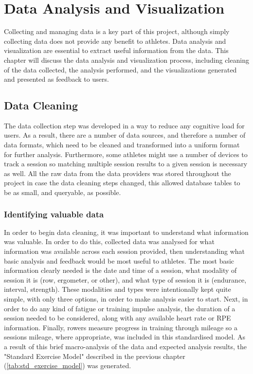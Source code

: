 \chapter{Data Analysis and Visualization} \label{chap:data-analysis-viz}
Collecting and managing data is a key part of this project, although simply collecting data does not provide any benefit to athletes. Data analysis and visualization are essential to extract useful information from the data. This chapter will discuss the data analysis and visualization process, including cleaning of the data collected, the analysis performed, and the visualizations generated and presented as feedback to users.

\section{Data Cleaning}\label{sec:data-cleaning}
The data collection step was developed in a way to reduce any cognitive load for users. As a result, there are a number of data sources, and therefore a number of data formats, which need to be cleaned and transformed into a uniform format for further analysis. Furthermore, some athletes might use a number of devices to track a session so matching multiple session results to a given session is necessary as well. All the raw data from the data providers was stored throughout the project in case the data cleaning steps changed, this allowed database tables to be as small, and queryable, as possible.
\subsection{Identifying valuable data}
In order to begin data cleaning, it was important to understand what information was valuable. In order to do this, collected data was analysed for what information was available across each session provided, then understanding what basic analysis and feedback would be most useful to athletes. The most basic information clearly needed is the date and time of a session, what modality of session it is (row, ergometer, or other), and what type of session it is (endurance, interval, strength). These modalities and types were intentionally kept quite simple, with only three options, in order to make analysis easier to start. Next, in order to do any kind of fatigue or training impulse analysis, the duration of a session needed to be considered, along with any available heart rate or RPE information. Finally, rowers measure progress in training through mileage so a sessions mileage, where appropriate, was included in this standardised model. As a result of this brief macro-analysis of the data and expected analysis results, the "Standard Exercise Model" described in the previous chapter (\autoref{tab:std_exercise_model}) was generated.

